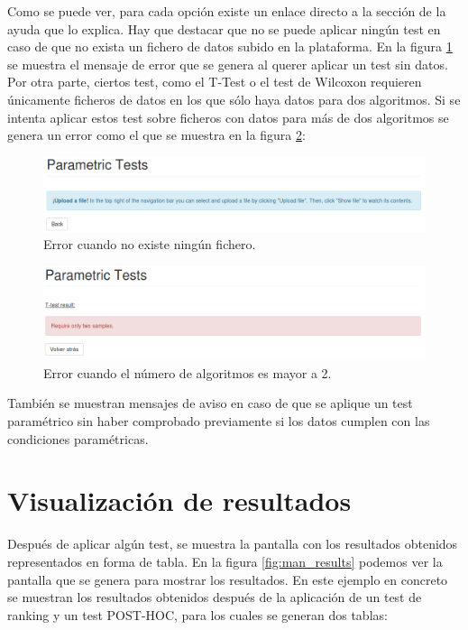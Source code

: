 Como se puede ver, para cada opción existe un enlace directo a la sección de la ayuda que lo explica. Hay que destacar que no se puede aplicar ningún test en caso de que no exista un fichero de datos subido en la plataforma. En la figura \ref{fig:man_nofichero} se muestra el mensaje de error que se genera al querer aplicar un test sin datos. Por otra parte, ciertos test, como el T-Test o el test de Wilcoxon requieren únicamente ficheros de datos en los que sólo haya datos para dos algoritmos. Si se intenta aplicar estos test sobre ficheros con datos para más de dos algoritmos se genera un error como el que se muestra en la figura \ref{fig:man_errorapli}:

\begin{figure}[H]
\centering
\includegraphics[scale=0.5]{figuras/man_nofichero.png}
\caption{Error cuando no existe ningún fichero.}
\label{fig:man_nofichero}
\end{figure}

\begin{figure}[H]
\centering
\includegraphics[scale=0.5]{figuras/man_errorapli.png}
\caption{Error cuando el número de algoritmos es mayor a 2.}
\label{fig:man_errorapli}
\end{figure}

También se muestran mensajes de aviso en caso de que se aplique un test paramétrico sin haber comprobado previamente si los datos cumplen con las condiciones paramétricas.

\section{Visualización de resultados}

Después de aplicar algún test, se muestra la pantalla con los resultados obtenidos representados en forma de tabla. En la figura \ref{fig:man_results} podemos ver la pantalla que se genera para mostrar los resultados. En este ejemplo en concreto se muestran los resultados obtenidos después de la aplicación de un test de ranking y un test POST-HOC, para los cuales se generan dos tablas:

